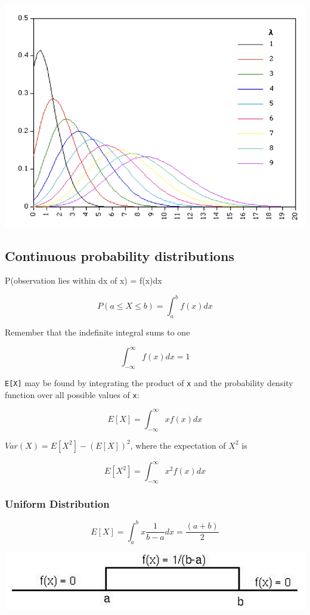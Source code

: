\documentclass[]{book}
\begin{document}
\begin{center}\includegraphics[width=0.7\linewidth]{images/week_2.005} \end{center}

\hypertarget{continuous-probability-distributions}{%
\subsection{\texorpdfstring{\textbf{Continuous probability distributions}}{Continuous probability distributions}}\label{continuous-probability-distributions}}

P(observation lies within dx of x) = f(x)dx

\[P(a\leq X \leq b) = \int_{a}^{b} f(x) dx\]

Remember that the indefinite integral sums to one

\[\int_{-\infty}^{\infty} f(x) dx = 1\]

\texttt{E{[}X{]}} may be found by integrating the product of \texttt{x} and the probability density function over all possible values of \texttt{x}:

\[E[X] = \int_{-\infty}^{\infty} xf(x) dx \]

\(Var(X) = E[X^2] - (E[X])^2\), where the expectation of \(X^2\) is

\[E[X^2] = \int_{-\infty}^{\infty} x^2f(x) dx \]

\hypertarget{uniform-distribution}{%
\subsubsection{\texorpdfstring{\textbf{Uniform Distribution}}{Uniform Distribution}}\label{uniform-distribution}}

\[E[X] = \int_{a}^{b} x\frac{1}{b-a} dx = \frac{(a+b)}{2} \]

\begin{center}\includegraphics[width=1\linewidth]{images/prob.019} \end{center}
\end{document}
